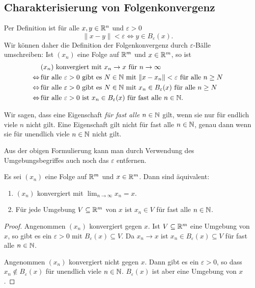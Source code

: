 \documentclass[a4paper,10pt]{article}
\begin{document}
\subsection{Charakterisierung von Folgenkonvergenz}


Per Definition ist für alle $x, y \in \mathbb{R}^n$ und $\varepsilon > 0$
\[
 \|x-y\| < \varepsilon \Leftrightarrow y \in B_\varepsilon(x).
\]
Wir können daher die Definition der Folgenkonvergenz durch $\varepsilon$-Bälle umschreiben: Ist $(x_n)$ eine Folge auf $\mathbb{R}^m$ und $x \in \mathbb{R}^m$, so ist
\begin{align*}
                 &\, \text{$(x_n)$ konvergiert mit $x_n \to x$ für $n \to \infty$   } \\
 \Leftrightarrow &\, \text{für alle $\varepsilon > 0$ gibt es $N \in \mathbb{N}$ mit $\|x - x_n\| < \varepsilon$ für alle $n \geq N$} \\
 \Leftrightarrow &\, \text{für alle $\varepsilon > 0$ gibt es $N \in \mathbb{N}$ mit $x_n \in B_\varepsilon(x)$ für alle $n \geq N$} \\
 \Leftrightarrow &\, \text{für alle $\varepsilon > 0$ ist $x_n \in B_\varepsilon(x)$ für fast alle $n \in \mathbb{N}$}.
\end{align*}


\begin{bem}
 Wir sagen, dass eine Eigenschaft \emph{für fast alle $n \in \mathbb{N}$} gilt, wenn sie nur für endlich viele $n$ nicht gilt. Eine Eigenschaft gilt nicht für fast alle $n \in \mathbb{N}$, genau dann wenn sie für unendlich viele $n \in \mathbb{N}$ nicht gilt.
\end{bem}


Aus der obigen Formulierung kann man durch Verwendung des Umgebungsbegriffes auch noch das $\varepsilon$ entfernen.


\begin{lem}
 Es sei $(x_n)$ eine Folge auf $\mathbb{R}^m$ und $x \in \mathbb{R}^m$. Dann sind äquivalent:
 \begin{enumerate}
  \item
   $(x_n)$ konvergiert mit $\lim_{n \to \infty} x_n = x$.
  \item
   Für jede Umgebung $V \subseteq \mathbb{R}^m$ von $x$ ist $x_n \in V$ für fast alle $n \in \mathbb{N}$.
 \end{enumerate}
\end{lem}
\begin{proof}
 Angenommen $(x_n)$ konvergiert gegen $x$. Ist $V \subseteq \mathbb{R}^m$ eine Umgebung von $x$, so gibt es ein $\varepsilon > 0$ mit $B_\varepsilon(x) \subseteq V$. Da $x_n \to x$ ist $x_n \in B_\varepsilon(x) \subseteq V$ für fast alle $n \in \mathbb{N}$.
 
 Angenommen $(x_n)$ konvergiert nicht gegen $x$. Dann gibt es ein $\varepsilon > 0$, so dass $x_n \notin B_\varepsilon(x)$ für unendlich viele $n \in \mathbb{N}$. $B_\varepsilon(x)$ ist aber eine Umgebung von $x$.
\end{proof}
\end{document}
